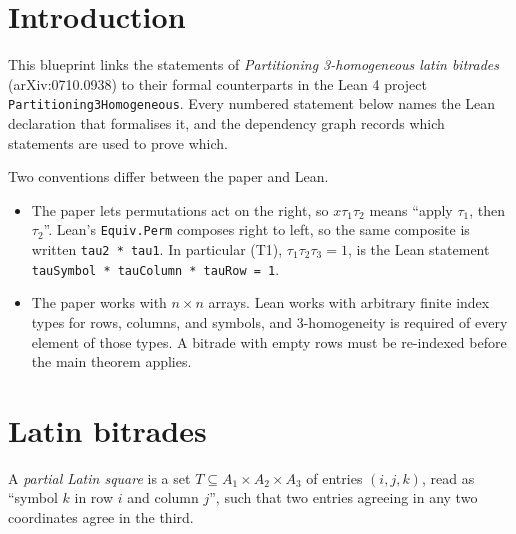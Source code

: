 %
%

\chapter{Introduction}

This blueprint links the statements of \emph{Partitioning 3-homogeneous
latin bitrades} (arXiv:0710.0938) to their formal counterparts in the Lean 4
project \texttt{Partitioning3Homogeneous}. Every numbered statement below
names the Lean declaration that formalises it, and the dependency graph
records which statements are used to prove which.

Two conventions differ between the paper and Lean.
\begin{itemize}
  \item The paper lets permutations act on the right, so $x\tau_1\tau_2$
    means ``apply $\tau_1$, then $\tau_2$''. Lean's \texttt{Equiv.Perm}
    composes right to left, so the same composite is written
    \texttt{tau2 * tau1}. In particular (T1), $\tau_1\tau_2\tau_3 = 1$, is
    the Lean statement \texttt{tauSymbol * tauColumn * tauRow = 1}.
  \item The paper works with $n \times n$ arrays. Lean works with arbitrary
    finite index types for rows, columns, and symbols, and 3-homogeneity is
    required of every element of those types. A bitrade with empty rows must
    be re-indexed before the main theorem applies.
\end{itemize}

\chapter{Latin bitrades}

\begin{definition}\label{def:partial-latin}
  \leanok
  A \emph{partial Latin square} is a set $T \subseteq A_1 \times A_2 \times A_3$
  of entries $(i, j, k)$, read as ``symbol $k$ in row $i$ and column $j$'',
  such that two entries agreeing in any two coordinates agree in the third.
\end{definition}

